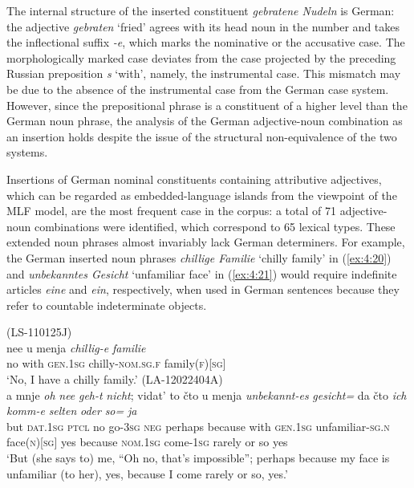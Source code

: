 \z

\noindent The internal structure of the inserted constituent \textit{gebratene Nudeln} is German: the adjective \textit{gebraten} `fried' agrees with its head noun in the number and takes the inflectional suffix \textit{-e}, which marks the nominative or the accusative case. The morphologically marked case deviates from the case projected by the preceding Russian preposition \textit{s} `with', namely, the instrumental case. This mismatch may be due to the absence of the instrumental case from the German case system.  However, since the prepositional phrase is a constituent of a higher level than the German noun phrase, the analysis of the German adjective-noun combination as an insertion holds despite the issue of the structural non-equivalence of the two systems.

Insertions of German nominal constituents containing attributive adjectives, which can be regarded as embedded-language islands from the viewpoint of the MLF model, are the most frequent case in the corpus: a total of 71 adjective-noun combinations were identified, which correspond to 65 lexical types. These extended noun phrases almost invariably lack German determiners. For example, the German inserted noun phrases \textit{chillige Familie} `chilly family' in (\ref{ex:4:20}) and  \textit{unbekanntes Gesicht} `unfamiliar face' in (\ref{ex:4:21}) would require indefinite articles \textit{eine} and \textit{ein}, respectively, when used in German sentences because they refer to countable indeterminate objects.

\ea
\label{ex:4:20}
(LS-110125J)\\
 \gll nee u menja \textit{chillig-e} \textit{familie}\\
 no with \textsc{gen.1sg} chilly-\textsc{nom.sg.f} family(\textsc{f})[\textsc{sg}]\\
\glt `No, I have a chilly family.'
\ex
\label{ex:4:21}
(LA-12022404A)\\
 \gll a mnje \textit{oh} \textit{nee} \textit{geh-t} \textit{nicht}; vidat' {to čto} u menja \textit{unbekannt-es} \textit{gesicht=}  da čto \textit{ich} \textit{komm-e} \textit{selten} \textit{oder} \textit{so=} \textit{ja}\\ 	
 but \textsc{dat.1sg} \textsc{ptcl} no go-\textsc{3sg} \textsc{neg} perhaps because with \textsc{gen.1sg} unfamiliar-\textsc{sg.n} face(\textsc{n})[\textsc{sg}] yes because \textsc{nom.1sg} come-\textsc{1sg} rarely or so yes\\ 
\glt `But (she says to) me, ``Oh no, that's impossible''; perhaps because my face is unfamiliar (to her), yes, because I come rarely or so, yes.'
\z

